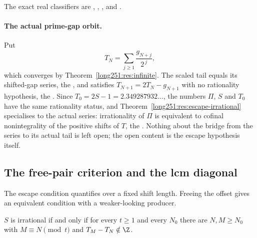 \noindent The exact real classifiers are
,
,
, and
.

\paragraph{The actual prime-gap orbit.}
Put
\[
 T_N=\sum_{j\ge1}\frac{g_{N+j}}{2^{\,j}},
\]
which converges by Theorem~\ref{long251:res:infinite}.  The scaled tail equals its
shifted-gap series, the
, and satisfies $T_{N+1}=2T_N-g_{N+1}$ with no rationality
hypothesis, the
.  Since $T_0=2S-1=2.349287932\ldots$, the numbers $\Pi$, $S$
and $T_0$ have the same rationality status, and
Theorem~\ref{long251:res:escape-irrational} specialises to the actual series:
irrationality of $\Pi$ is equivalent to cofinal nonintegrality of the positive
shifts of $T$, the
.  Nothing about the bridge from the series to its actual tail is
left open; the open content is the escape hypothesis itself.

\subsection{The free-pair criterion and the lcm diagonal}\label{long251:sec:freepair}

The escape condition quantifies over a fixed shift length.  Freeing the offset
gives an equivalent condition with a weaker-looking producer.

\begin{theorem}\label{long251:res:freepair}
$S$ is irrational if and only if for every $t\ge1$ and every $N_0$ there are
$N,M\ge N_0$ with $M\equiv N\pmod t$ and $T_M-T_N\notin\Z$.
\end{theorem}


